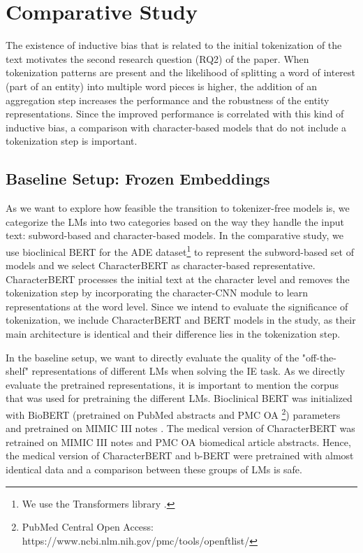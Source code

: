\documentclass[runningheads]{llncs}
\begin{document}
\section{Comparative Study}
\vspace{-4.5mm}
The existence of inductive bias that is related to the initial tokenization of the text motivates the second research question (RQ2) of the paper. When tokenization patterns are present and the likelihood of splitting a word of interest (part of an entity) into multiple word pieces is higher, the addition of an aggregation step increases the performance and the robustness of the entity representations. Since the improved performance is correlated with this kind of inductive bias, a comparison with character-based models that do not include a tokenization step is important.
\vspace{-4.5mm}
\subsection{Baseline Setup: Frozen Embeddings}
\vspace{-3mm}
As we want to explore how feasible the transition to tokenizer-free models is, we categorize the LMs into two categories based on the way they handle the input text: subword-based and character-based models. In the comparative study, we use bioclinical BERT for the ADE dataset\footnote{We use the Transformers library \cite{wolf-etal-2020-transformers}.} to represent the subword-based set of models and we select CharacterBERT \cite{el-boukkouri-etal-2020-characterbert} as character-based representative. CharacterBERT processes the initial text at the character level and removes the tokenization step by incorporating the character-CNN module \cite{peters-etal-2018-deep} to learn representations at the word level. Since we intend to evaluate the significance of tokenization, we include CharacterBERT and BERT models in the study, as their main architecture is identical and their difference lies in the tokenization step. 

In the baseline setup, we want to directly evaluate the quality of the "off-the-shelf" representations of different LMs when solving the IE task. As we directly evaluate the pretrained representations, it is important to mention the corpus that was used for pretraining the different LMs. Bioclinical BERT was initialized with BioBERT (pretrained on PubMed abstracts and PMC OA \footnote{PubMed Central Open Access: https://www.ncbi.nlm.nih.gov/pmc/tools/openftlist/}) \cite{lee2020biobert} parameters and pretrained on MIMIC III notes \cite{johnson2016mimic}. The medical version of CharacterBERT was retrained on MIMIC III notes and PMC OA biomedical article abstracts. Hence, the medical version of CharacterBERT and b-BERT were pretrained with almost identical data and a comparison between these groups of LMs is safe.
\end{document}
